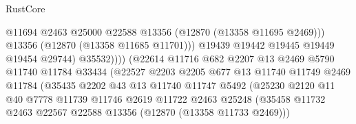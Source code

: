 \begin{lexlean}{RustCore}
\begin{coremodule}
                                            @11694
                                            @2463
                                            @25000
                                            @22588
                                            @13356
                                            (@12870 (@13358 @11695 @2469)))
                                          @13356
                                          (@12870 (@13358 @11685 @11701)))
                                        @19439
                                        @19442
                                        @19445
                                        @19449
                                        @19454
                                        @29744)
                                      @35532))))
                              (@22614
                                @11716
                                @682
                                @2207
                                @13
                                @2469
                                @5790
                                @11740
                                @11784
                                @33434
                                (@22527
                                  @2203
                                  @2205
                                  @677
                                  @13
                                  @11740
                                  @11749
                                  @2469
                                  @11784
                                  (@35435
                                    @2202
                                    @43
                                    @13
                                    @11740
                                    @11747
                                    @5492
                                    (@25230
                                      @2120
                                      @11
                                      @40
                                      @7778
                                      @11739
                                      @11746
                                      @2619
                                      @11722
                                      @2463
                                      @25248
                                      (@35458
                                        @11732
                                        @2463
                                        @22567
                                        @22588
                                        @13356
                                        (@12870 (@13358 @11733 @2469)))

\end{coremodule}
\end{lexlean}
